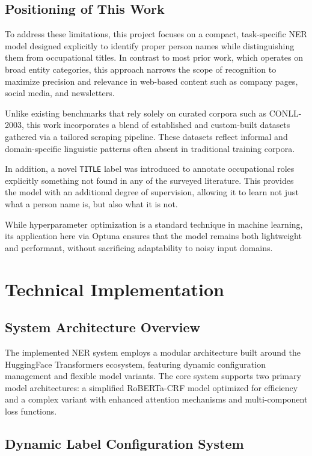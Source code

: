 \documentclass[a4paper]{usiinfbachelorproject}
\begin{document}
\subsection{Positioning of This Work}

To address these limitations, this project focuses on a compact, task-specific NER model designed explicitly to identify proper person names while distinguishing them from occupational titles. In contrast to most prior work, which operates on broad entity categories, this approach narrows the scope of recognition to maximize precision and relevance in web-based content such as company pages, social media, and newsletters.

Unlike existing benchmarks that rely solely on curated corpora such as CONLL-2003, this work incorporates a blend of established and custom-built datasets gathered via a tailored scraping pipeline. These datasets reflect informal and domain-specific linguistic patterns often absent in traditional training corpora.

In addition, a novel \texttt{TITLE} label was introduced to annotate occupational roles explicitly something not found in any of the surveyed literature. This provides the model with an additional degree of supervision, allowing it to learn not just what a person name is, but also what it is not.

While hyperparameter optimization is a standard technique in machine learning, its application here via Optuna ensures that the model remains both lightweight and performant, without sacrificing adaptability to noisy input domains.

\section{\textbf{Technical Implementation}}

\subsection{System Architecture Overview}

The implemented NER system employs a modular architecture built around the HuggingFace Transformers ecosystem, featuring dynamic configuration management and flexible model variants. The core system supports two primary model architectures: a simplified RoBERTa-CRF model optimized for efficiency and a complex variant with enhanced attention mechanisms and multi-component loss functions.

\subsection{Dynamic Label Configuration System}
\end{document}
